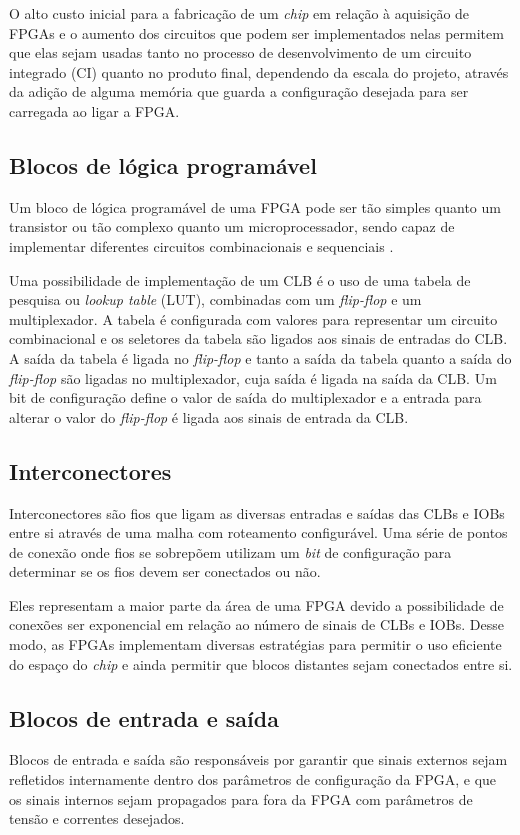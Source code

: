 O alto custo inicial para a fabricação de um \emph{chip} em relação à aquisição de FPGAs e o aumento dos
circuitos que podem ser implementados nelas permitem que elas sejam usadas tanto no processo de 
desenvolvimento de um circuito integrado (CI) quanto no produto final, dependendo da escala do projeto,
através da adição de alguma memória que guarda a configuração desejada para ser carregada ao ligar a FPGA.

\subsection{Blocos de lógica programável }
\label{sec:clb}

Um bloco de lógica programável de uma FPGA pode ser tão simples quanto um transistor ou tão complexo quanto um
microprocessador, sendo capaz de implementar diferentes circuitos combinacionais e sequenciais \citep{rose1993architecture}.

Uma possibilidade de implementação de um CLB é o uso de uma tabela de pesquisa ou \emph{lookup table} (LUT), combinadas com um
\emph{flip-flop} e um multiplexador. A tabela é configurada com valores para representar um circuito combinacional e os seletores da tabela
são ligados aos sinais de entradas do CLB. A saída da tabela é ligada no \emph{flip-flop} e tanto a saída da tabela quanto a saída do \emph{flip-flop} são
ligadas no multiplexador, cuja saída é ligada na saída da CLB. Um bit de configuração define o valor de saída do multiplexador e a entrada para
alterar o valor do \emph{flip-flop} é ligada aos sinais de entrada da CLB.


\subsection{Interconectores}
\label{sec:inter}

Interconectores são fios que ligam as diversas entradas e saídas das CLBs e IOBs entre si através de uma malha com roteamento configurável.
Uma série de pontos de conexão onde fios se sobrepõem utilizam um \emph{bit} de configuração para determinar se os fios devem ser conectados ou não.

Eles representam a maior parte da área de uma FPGA devido a possibilidade de conexões ser exponencial em relação ao número de sinais de CLBs e IOBs.
Desse modo, as FPGAs implementam diversas estratégias para permitir o uso eficiente do espaço do \emph{chip} e ainda permitir que blocos distantes 
sejam conectados entre si.

\subsection{Blocos de entrada e saída}
\label{sec:iob}

Blocos de entrada e saída são responsáveis por garantir que sinais externos sejam refletidos internamente dentro dos parâmetros de configuração da FPGA, e
que os sinais internos sejam propagados para fora da FPGA com parâmetros de tensão e correntes desejados.
